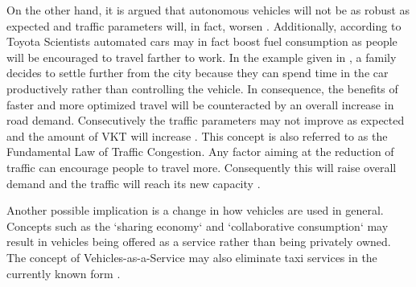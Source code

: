 \documentclass[11pt,english,twoside]{article}
\begin{document}
On the other hand, it is argued that autonomous vehicles will not be as robust as expected and traffic parameters will, in fact, worsen \citep{sivak2015road}. Additionally, according to Toyota Scientists \citep{toyota1} automated cars may in fact boost fuel consumption as people will be encouraged to travel farther to work. In the example given in \citet{litman2014autonomous}, a family decides to settle further from the city because they can spend time in the car productively rather than controlling the vehicle. In consequence, the benefits of faster and more optimized travel will be counteracted by an overall increase in road demand. Consecutively the traffic parameters may not improve as expected and the amount of VKT will increase \citep{litman2014autonomous}. This concept is also referred to as the Fundamental Law of Traffic Congestion. Any factor aiming at the reduction of traffic can encourage people to travel more. Consequently this will raise overall demand and the traffic will reach its new capacity \citep{duranton2011fundamental}.

\par
Another possible implication is a change in how vehicles are used in general. Concepts such as the `sharing economy` and `collaborative consumption` may result in vehicles being offered as a service rather than being privately owned. The concept of Vehicles-as-a-Service may also eliminate taxi services in the currently known form  \citep{levinson2015climbing}.

















\end{document}
